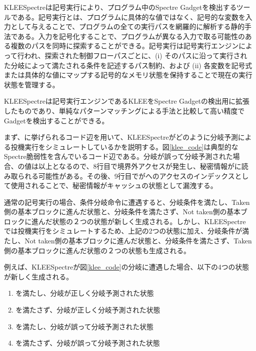 KLEESpectre\cite{wang2020kleespectre}は記号実行により、プログラム中のSpectre Gadgetを検出するツールである。記号実行とは、プログラムに具体的な値ではなく、記号的な変数を入力として与えることで、プログラムの全ての実行パスを網羅的に解析する静的手法である。入力を記号化することで、プログラムが異なる入力で取る可能性のある複数のパスを同時に探索することができる。記号実行は記号実行エンジンによって行われ、探索された制御フローパスごとに、(i) そのパスに沿って実行された分岐によって満たされる条件を記述するパス制約、および (ii) 各変数を記号式または具体的な値にマップする記号的なメモリ状態を保持することで現在の実行状態を管理する\cite{baldoni2018survey}。\par

KLEESpectreは記号実行エンジンであるKLEE\cite{cadar2008klee}をSpectre Gadgetの検出用に拡張したものであり、単純なパターンマッチングによる手法\cite{Spectre-Scanner}と比較して高い精度でGadgetを検出することができる。\par
まず、\cite{wang2020kleespectre}に挙げられるコード辺を用いて、KLEESpectreがどのように分岐予測による投機実行をシミュレートしているかを説明する。図\ref{klee_code}は典型的なSpectre脆弱性を含んでいるコード辺である。分岐が誤って分岐予測された場合、の値は以上となるので、8行目で境界外アクセスが発生し、秘密情報がに読み取られる可能性がある。その後、9行目でがへのアクセスのインデックスとして使用されることで、秘密情報がキャッシュの状態として漏洩する。\par
通常の記号実行の場合、条件分岐命令に遭遇すると、分岐条件を満たし、Taken側の基本ブロックに進んだ状態と、分岐条件を満たさず、Not taken側の基本ブロックに進んだ状態の２つの状態が新しく生成される。しかし、KLEESpectreでは投機実行をシミュレートするため、上記の2つの状態に加え、分岐条件が満たし、Not taken側の基本ブロックに進んだ状態と、分岐条件を満たさず、Taken側の基本ブロックに進んだ状態の２つの状態も生成される。\par
例えば、KLEESpectreが図\ref{klee_code}の分岐に遭遇した場合、以下の4つの状態が新しく生成される。\par

\begin{enumerate}[label=(\arabic*)]
  \item {} を満たし、分岐が正しく分岐予測された状態
  \item {} を満たさず、分岐が正しく分岐予測された状態
  \item {} を満たし、分岐が誤って分岐予測された状態
  \item {} を満たさず、分岐が誤って分岐予測された状態
\end{enumerate}

